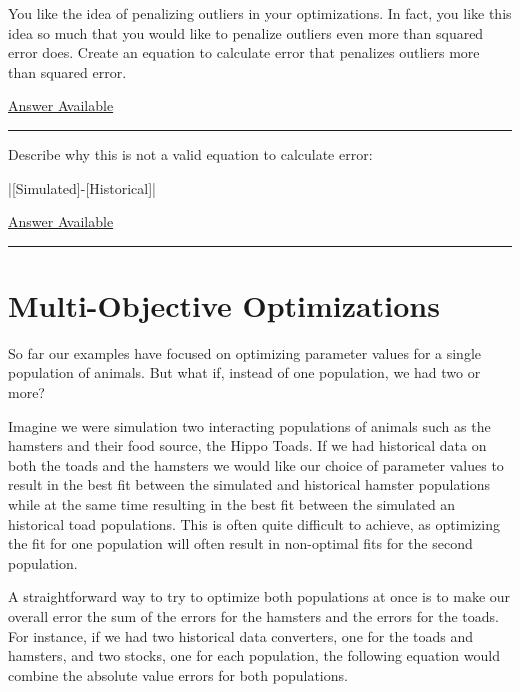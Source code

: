 \documentclass[]{memoir}
\newcommand{\NormalTok}[1]{{#1}}
\begin{document}

You like the idea of penalizing outliers in your optimizations. In fact,
you like this idea so much that you would like to penalize outliers even
more than squared error does. Create an equation to calculate error that
penalizes outliers more than squared error.

\hyperref[Ans-12-2]{Answer Available}

\begin{center}\rule{3in}{0.4pt}\end{center}


Describe why this is not a valid equation to calculate error:

|\NormalTok{[Simulated]-[Historical]}|

\hyperref[Ans-12-3]{Answer Available}

\begin{center}\rule{3in}{0.4pt}\end{center}

\section{Multi-Objective Optimizations}

So far our examples have focused on optimizing parameter values for a
single population of animals. But what if, instead of one population, we
had two or more?

Imagine we were simulation two interacting populations of animals such
as the hamsters and their food source, the Hippo Toads. If we had
historical data on both the toads and the hamsters we would like our
choice of parameter values to result in the best fit between the
simulated and historical hamster populations while at the same time
resulting in the best fit between the simulated an historical toad
populations. This is often quite difficult to achieve, as optimizing the
fit for one population will often result in non-optimal fits for the
second population.

A straightforward way to try to optimize both populations at once is to
make our overall error the sum of the errors for the hamsters and the
errors for the toads. For instance, if we had two historical data
converters, one for the toads and hamsters, and two stocks, one for each
population, the following equation would combine the absolute value
errors for both populations.
\end{document}
